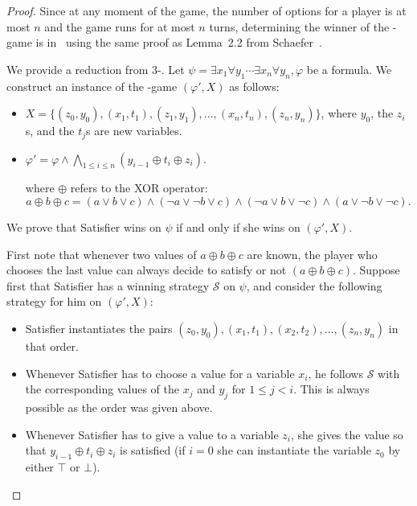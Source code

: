 \documentclass{article}
\newcommand{\strat}{\mathcal{S}}
\newcommand{\PS}{\lang{Paired~SAT}\xspace}
\newcommand{\QBF}{\lang{QBF}\xspace}
\begin{document}
\begin{proof}
Since at any moment of the game, the number of options for a player is at most $n$ and the game runs for at most $n$ turns, determining the winner of the \PS-game is in \PSPACE\ using the same proof as Lemma~2.2 from Schaefer~\cite{Sch78}.


We provide a reduction from 3-\QBF. Let $\psi = \exists x_1 \forall y_1 \cdots \exists x_n \forall y_n, \varphi$ be a \QBF formula. We construct an instance of the \PS-game $(\varphi', X)$ as follows: 

\begin{itemize}
    \item $X = \{(z_0, y_0), (x_1, t_1), (z_1, y_1), \dots, (x_n, t_n), (z_n, y_n)\}$, where $y_0$, the $z_i$s, and the $t_j$s are new variables.
    \item $\varphi' = \varphi \wedge \bigwedge\limits_{1 \le i \le n} (y_{i-1} \oplus t_i \oplus z_i)$. 
    
    where $\oplus$ refers to the XOR operator:
    \[a \oplus b \oplus c = (a \vee b \vee c) \wedge (\neg a \vee \neg b \vee c) \wedge (\neg a \vee b \vee \neg c) \wedge (a \vee \neg b \vee \neg c).\]
\end{itemize}

We prove that Satisfier wins on $\psi$ if and only if she wins on $(\varphi', X)$.

First note that whenever two values of $a \oplus b \oplus c$ are known, the player who chooses the last value can always decide to satisfy or not $(a \oplus b \oplus c)$.
Suppose first that Satisfier has a winning strategy $\strat$ on $\psi$, and consider the following strategy for him on $(\varphi', X)$:

\begin{itemize}
    \item Satisfier instantiates the pairs $(z_0, y_0), (x_1, t_1), (x_2, t_2), \dots, (z_n, y_n)$ in that order.
    \item Whenever Satisfier has to choose a value for a variable $x_i$, he follows $\strat$ with the corresponding values of the $x_j$ and $y_j$ for $1 \le j < i$. This is always possible as the order was given above.
    \item Whenever Satisfier has to give a value to a variable $z_i$, she gives the value so that $y_{i-1} \oplus t_i \oplus z_i$ is satisfied (if $i=0$ she can instantiate the variable $z_0$ by either $\top$ or $\bot$).
\end{itemize}


\end{proof}
\end{document}
